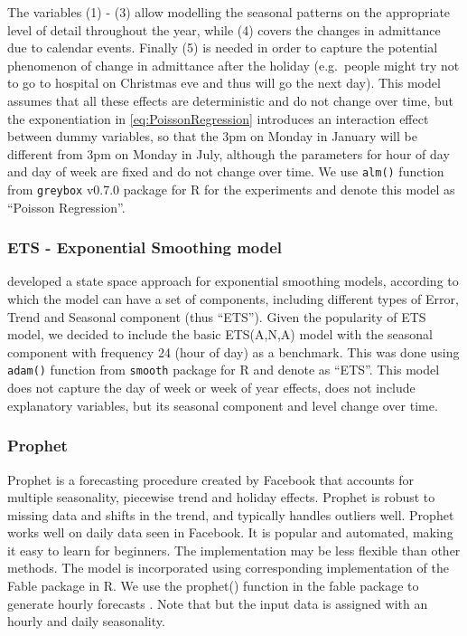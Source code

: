 \documentclass[]{elsarticle} %
\begin{document}
The variables (1) - (3) allow modelling the seasonal patterns on the appropriate level of detail throughout the year, while (4) covers the changes in admittance due to calendar events. Finally (5) is needed in order to capture the potential phenomenon of change in admittance after the holiday (e.g.~people might try not to go to hospital on Christmas eve and thus will go the next day). This model assumes that all these effects are deterministic and do not change over time, but the exponentiation in \eqref{eq:PoissonRegression} introduces an interaction effect between dummy variables, so that the 3pm on Monday in January will be different from 3pm on Monday in July, although the parameters for hour of day and day of week are fixed and do not change over time. We use \texttt{alm()} function from \texttt{greybox} v0.7.0 package \citep{Svetunkov2021Greybox} for R \citep{RTeam2021} for the experiments and denote this model as ``Poisson Regression''.

\hypertarget{ets---exponential-smoothing-model}{%
\subsubsection{ETS - Exponential Smoothing model}\label{ets---exponential-smoothing-model}}

\citet{Hyndman2008b} developed a state space approach for exponential smoothing models, according to which the model can have a set of components, including different types of Error, Trend and Seasonal component (thus ``ETS''). Given the popularity of ETS model, we decided to include the basic ETS(A,N,A) model with the seasonal component with frequency 24 (hour of day) as a benchmark. This was done using \texttt{adam()} function from \texttt{smooth} package \citep{Svetunkov2021Smooth} for R and denote as ``ETS''. This model does not capture the day of week or week of year effects, does not include explanatory variables, but its seasonal component and level change over time.

\hypertarget{prophet}{%
\subsubsection{Prophet}\label{prophet}}

Prophet is a forecasting procedure created by Facebook \citep{taylor2018forecasting} that accounts for multiple seasonality, piecewise trend and holiday effects. Prophet is robust to missing data and shifts in the trend, and typically handles outliers well. Prophet works well on daily data seen in Facebook. It is popular and automated, making it easy to learn for beginners. The implementation may be less flexible than other methods.
The model is incorporated using corresponding implementation of the Fable package in R. We use the prophet() function in the fable package to generate hourly forecasts \citep{fable2020}. Note that but the input data is assigned with an hourly and daily seasonality.
\end{document}
